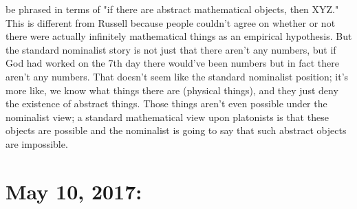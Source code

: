\documentclass[12pt]{article}
\theoremstyle{definition}
\begin{document}
\begin{enumerate}
        be phrased in terms of "if there are abstract mathematical objects,
        then XYZ." This is different from Russell because people couldn't agree
        on whether or not there were actually infinitely mathematical things as
        an empirical hypothesis. But the standard nominalist story is not just
        that there aren't any numbers, but if God had worked on the 7th day
        there would've been numbers but in fact there aren't any numbers. That
        doesn't seem like the standard nominalist position; it's more like, we
        know what things there are (physical things), and they just deny the
        existence of abstract things. Those things aren't even possible under
        the nominalist view; a standard mathematical view upon platonists is
        that these objects are possible and the nominalist is going to say that
        such abstract objects are impossible.

\end{enumerate}

\section{May 10, 2017: }
\end{document}
